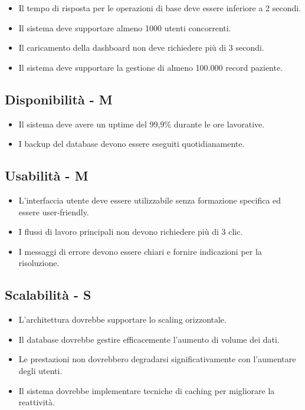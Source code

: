 \documentclass[12pt,a4paper,oneside]{report}
\begin{document}
\begin{itemize}
    \item Il tempo di risposta per le operazioni di base deve essere inferiore a 2 secondi.
    \item Il sistema deve supportare almeno 1000 utenti concorrenti.
    \item Il caricamento della dashboard non deve richiedere più di 3 secondi.
    \item Il sistema deve supportare la gestione di almeno 100.000 record paziente.
\end{itemize}

\subsection{Disponibilità  - M}

\begin{itemize}
    \item Il sistema deve avere un uptime del 99,9\% durante le ore lavorative.
    \item I backup del database devono essere eseguiti quotidianamente.
\end{itemize}

\subsection{Usabilità  - M}

\begin{itemize}
    \item L'interfaccia utente deve essere utilizzabile senza formazione specifica ed essere user-friendly.
    \item I flussi di lavoro principali non devono richiedere più di 3 clic.
    \item I messaggi di errore devono essere chiari e fornire indicazioni per la risoluzione.
\end{itemize}

\subsection{Scalabilità - S}

\begin{itemize}
    \item  L'architettura dovrebbe supportare lo scaling orizzontale.
    \item Il database dovrebbe gestire efficacemente l'aumento di volume dei dati.
    \item Le prestazioni non dovrebbero degradarsi significativamente con l'aumentare degli utenti.
    \item Il sistema dovrebbe implementare tecniche di caching per migliorare la reattività.
\end{itemize}
\end{document}
